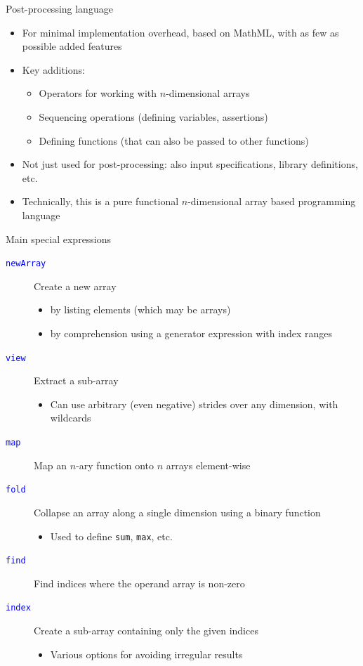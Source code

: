 \documentclass[t,xcolor={usenames,dvipsnames}]{beamer}
\newcommand{\subitem}[1]{\begin{itemize}[<.->]\item #1 \end{itemize}}
\newcommand{\csym}[1]{\textcolor{Blue}{\texttt{#1}}}
\begin{document}
\begin{frame}{Post-processing language}
\begin{itemize}
\item For minimal implementation overhead, based on MathML, with as few as possible added features
\item Key additions:
  \begin{itemize}
  \item Operators for working with $n$-dimensional arrays
  \item Sequencing operations (defining variables, assertions)
  \item Defining functions (that can also be passed to other functions)
  \end{itemize}
\item Not just used for post-processing: also input specifications, library definitions, etc.
\item Technically, this is a \alert{pure} functional $n$-dimensional array based programming language
\end{itemize}
\end{frame}

\begin{frame}{Main special expressions}
\footnotesize
\begin{description}
\item[\csym{newArray}] Create a new array
  \begin{itemize}
  \item by listing elements (which may be arrays)
  \item by \alert{comprehension} using a generator expression with index ranges%
  \end{itemize}
\item[\csym{view}] Extract a sub-array
  \subitem{Can use arbitrary (even negative) strides over any dimension, with wildcards}
\item[\csym{map}] Map an $n$-ary function onto $n$ arrays element-wise
\item[\csym{fold}] Collapse an array along a single dimension using a binary function
  \subitem{Used to define \texttt{sum}, \texttt{max}, etc.}
\item[\csym{find}] Find indices where the operand array is non-zero
\item[\csym{index}] Create a sub-array containing only the given indices
  \subitem{Various options for avoiding irregular results}
\end{description}
\end{frame}
\end{document}
